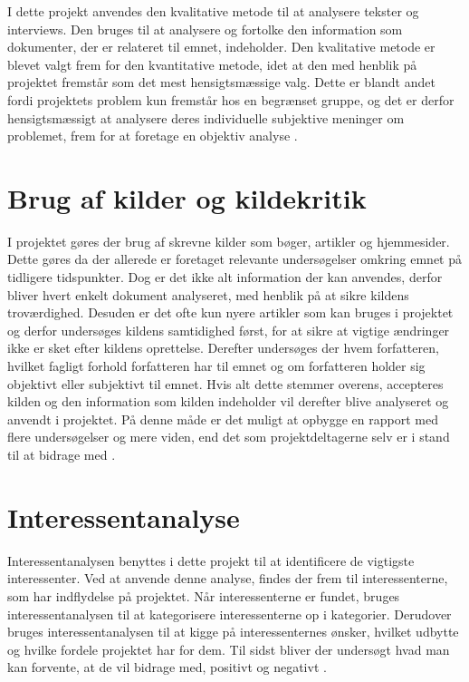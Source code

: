 I dette projekt anvendes den kvalitative metode til at analysere tekster og  interviews. Den bruges til at analysere og fortolke den information som dokumenter, der er relateret til emnet, indeholder. Den kvalitative metode er blevet valgt frem for den kvantitative metode, idet at den med henblik på projektet fremstår som det mest hensigtsmæssige valg. Dette er blandt andet fordi projektets problem kun fremstår hos en begrænset gruppe, og det er derfor hensigtsmæssigt at analysere deres individuelle subjektive meninger om problemet, frem for at foretage en objektiv analyse \citep{Gymportalen}.

\section{Brug af kilder og kildekritik}
I projektet gøres der brug af skrevne kilder som bøger, artikler og hjemmesider. Dette gøres da der allerede er foretaget relevante undersøgelser omkring emnet på tidligere tidspunkter. Dog er det ikke alt information der kan anvendes, derfor bliver hvert enkelt dokument analyseret, med henblik på at sikre kildens troværdighed. Desuden er det ofte kun nyere artikler som kan bruges i projektet og derfor undersøges kildens samtidighed først, for at sikre at vigtige ændringer ikke er sket efter kildens oprettelse. Derefter undersøges der hvem forfatteren, hvilket fagligt forhold forfatteren har til emnet og om forfatteren holder sig objektivt eller subjektivt til emnet. Hvis alt dette stemmer overens, accepteres kilden og den information som kilden indeholder vil derefter blive analyseret og anvendt i projektet. På denne måde er det muligt at opbygge en rapport med flere undersøgelser og mere viden, end det som projektdeltagerne selv er i stand til at bidrage med \citep{Kildekritik}.

\section{Interessentanalyse}
Interessentanalysen benyttes i dette projekt til at identificere de vigtigste interessenter. Ved at anvende denne analyse, findes der frem til interessenterne, som har indflydelse på projektet. Når interessenterne er fundet, bruges interessentanalysen til at kategorisere interessenterne op i kategorier. Derudover bruges interessentanalysen til at kigge på interessenternes ønsker, hvilket udbytte og hvilke fordele projektet har for dem. Til sidst bliver der undersøgt hvad man kan forvente, at de vil bidrage med, positivt og negativt \citep{MetteLindegaardAttrup2008}.


